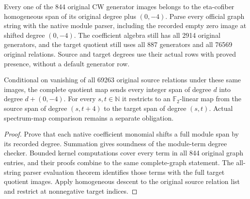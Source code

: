 \begin{proposition}
  \label{prop:lin-native-cw-map-grading}
  \leanok
  Every one of the 844 original CW generator images belongs to the
  eta-cofiber homogeneous span of its original degree plus $(0,-4)$.
  Parse every official graph string with the native module parser, including
  the recorded empty zero image at shifted degree $(0,-4)$. The coefficient
  algebra still has all 2914 original generators, and the target quotient
  still uses all 887 generators and all 76569 original relations.
  Source and target degrees use their actual rows with proved presence,
  without a default generator row.

  Conditional on vanishing of all 69263 original source relations under
  these same images, the complete quotient map sends every integer span
  of degree $d$ into degree $d+(0,-4)$. For every $s,t\in\mathbb N$ it
  restricts to an $\mathbb F_2$-linear map from the source span of degree
  $(s,t+4)$ to the target span of degree $(s,t)$.
  Actual spectrum-map comparison remains a separate obligation.
\end{proposition}
\begin{proof}
  \leanok
  Prove that each native coefficient monomial shifts a full module span by
  its recorded degree. Summation gives soundness of the module-term degree
  checker. Bounded kernel computations cover every term in all 844 original
  graph entries, and their proofs combine to the same complete-graph statement.
  The all-string parser evaluation theorem identifies those terms with the
  full target quotient images. Apply homogeneous descent to the original
  source relation list and restrict at nonnegative target indices.
\end{proof}

